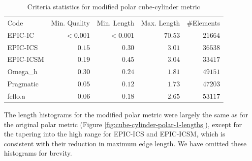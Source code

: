 \documentclass[3p,times,procedia,number]{elsarticle}
\begin{document}
\begin{table}
\caption{Criteria statistics for modified polar cube-cylinder metric}
\label{tab:polar-2-stats}
\begin{tabular}{lrrrr}
Code & Min. Quality & Min. Length & Max. Length & \#Elements\\
EPIC-IC    &$<0.001$&     $<0.001$&      $70.53$&    $21664$\\
EPIC-ICS   &$  0.15$&     $  0.30$&      $ 3.01$&    $36538$\\
EPIC-ICSM  &$  0.19$&     $  0.45$&      $ 3.04$&    $33417$\\
Omega\_h   &$  0.30$&     $  0.24$&      $ 1.81$&    $49151$\\
Pragmatic  &$  0.05$&     $  0.12$&      $ 1.73$&    $47203$\\
feflo.a    &$  0.06$&     $  0.18$&      $ 2.65$&    $53117$\\
\end{tabular}
\end{table}

The length histograms for the modified polar metric were largely the
same as for the original polar metric
(Figure \ref{fig:cube-cylinder-polar-1-lengths}),
except for the tapering into the high range for EPIC-ICS and EPIC-ICSM,
which is consistent with their reduction in maximum edge length.
We have omitted these histograms for brevity.

\end{document}
